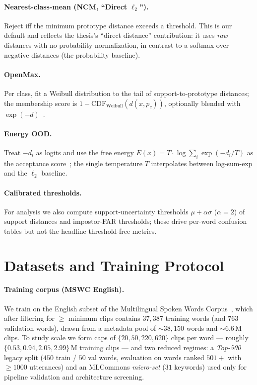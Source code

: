 \documentclass[10pt,twocolumn]{article}
\begin{document}
\paragraph{Nearest-class-mean (NCM, ``Direct $\ell_2$'').}
Reject iff the minimum prototype distance exceeds a threshold. This is our
default and reflects the thesis's ``direct distance'' contribution: it uses
\emph{raw} distances with no probability normalization, in contrast to a softmax
over negative distances (the probability baseline).

\paragraph{OpenMax.}
Per class, fit a Weibull distribution to the tail of support-to-prototype
distances; the membership score is $1-\mathrm{CDF}_{\text{Weibull}}(d(x,p_c))$,
optionally blended with $\exp(-d)$~\cite{bendale2016openmax}.

\paragraph{Energy OOD.}
Treat $-d_i$ as logits and use the free energy
$E(x)=T\cdot\log\!\sum_i \exp(-d_i/T)$ as the acceptance
score~\cite{liu2020energy}; the single temperature $T$ interpolates between
log-sum-exp and the $\ell_2$ baseline.

\paragraph{Calibrated thresholds.}
For analysis we also compute support-uncertainty thresholds
$\mu+\alpha\sigma$ ($\alpha{=}2$) of support distances and impostor-FAR
thresholds; these drive per-word confusion tables but not the headline
threshold-free metrics.

\section{Datasets and Training Protocol}\label{sec:data}

\paragraph{Training corpus (MSWC English).}
We train on the English subset of the Multilingual Spoken Words
Corpus~\cite{mazumder2021mswc}, which after filtering for $\ge$ minimum clips
contains $37{,}387$ training words (and $763$ validation words), drawn from a
metadata pool of $\sim$$38{,}150$ words and $\sim$6.6\,M clips. To study scale
we form caps of $\{20,50,220,620\}$ clips per word --- roughly
$\{0.53,0.94,2.05,2.99\}$\,M training clips --- and two reduced regimes:
a \emph{Top-500} legacy split ($450$ train / $50$ val words, evaluation on words
ranked $501+$ with $\ge1000$ utterances) and an MLCommons \emph{micro-set}
($31$ keywords) used only for pipeline validation and architecture screening.
\end{document}
